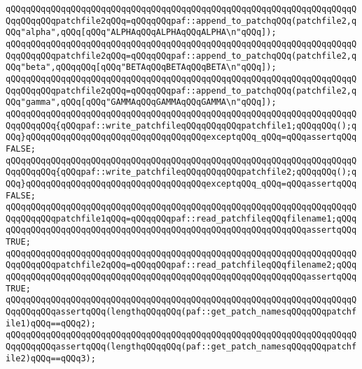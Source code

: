 \newline
\verb|qQQqqQQqqQQqqQQqqQQqqQQqqQQqqQQqqQQqqQQqqQQqqQQqqQQqqQQqqQQqqQQqqQQqqQQqqQQqqQQqpatchfile2qQQq=qQQqqQQqpaf::append_to_patchqQQq(patchfile2,qQQq"alpha",qQQq[qQQq"ALPHAqQQqALPHAqQQqALPHA\n"qQQq]);|\newline
\verb|qQQqqQQqqQQqqQQqqQQqqQQqqQQqqQQqqQQqqQQqqQQqqQQqqQQqqQQqqQQqqQQqqQQqqQQqqQQqqQQqpatchfile2qQQq=qQQqqQQqpaf::append_to_patchqQQq(patchfile2,qQQq"beta",qQQqqQQq[qQQq"BETAqQQqBETAqQQqBETA\n"qQQq]);|\newline
\verb|qQQqqQQqqQQqqQQqqQQqqQQqqQQqqQQqqQQqqQQqqQQqqQQqqQQqqQQqqQQqqQQqqQQqqQQqqQQqqQQqpatchfile2qQQq=qQQqqQQqpaf::append_to_patchqQQq(patchfile2,qQQq"gamma",qQQq[qQQq"GAMMAqQQqGAMMAqQQqGAMMA\n"qQQq]);|\newline
\newline
\verb|qQQqqQQqqQQqqQQqqQQqqQQqqQQqqQQqqQQqqQQqqQQqqQQqqQQqqQQqqQQqqQQqqQQqqQQqqQQqqQQq{qQQqpaf::write_patchfileqQQqqQQqqQQqpatchfile1;qQQqqQQq();qQQq}qQQqqQQqqQQqqQQqqQQqqQQqqQQqqQQqqQQqexceptqQQq_qQQq=qQQqassertqQQqFALSE;|\newline
\verb|qQQqqQQqqQQqqQQqqQQqqQQqqQQqqQQqqQQqqQQqqQQqqQQqqQQqqQQqqQQqqQQqqQQqqQQqqQQqqQQq{qQQqpaf::write_patchfileqQQqqQQqqQQqpatchfile2;qQQqqQQq();qQQq}qQQqqQQqqQQqqQQqqQQqqQQqqQQqqQQqqQQqexceptqQQq_qQQq=qQQqassertqQQqFALSE;|\newline
\newline
\newline
\newline
\verb|qQQqqQQqqQQqqQQqqQQqqQQqqQQqqQQqqQQqqQQqqQQqqQQqqQQqqQQqqQQqqQQqqQQqqQQqqQQqqQQqpatchfile1qQQq=qQQqqQQqpaf::read_patchfileqQQqfilename1;qQQqqQQqqQQqqQQqqQQqqQQqqQQqqQQqqQQqqQQqqQQqqQQqqQQqqQQqqQQqqQQqassertqQQqTRUE;|\newline
\verb|qQQqqQQqqQQqqQQqqQQqqQQqqQQqqQQqqQQqqQQqqQQqqQQqqQQqqQQqqQQqqQQqqQQqqQQqqQQqqQQqpatchfile2qQQq=qQQqqQQqpaf::read_patchfileqQQqfilename2;qQQqqQQqqQQqqQQqqQQqqQQqqQQqqQQqqQQqqQQqqQQqqQQqqQQqqQQqqQQqqQQqassertqQQqTRUE;|\newline
\newline
\verb|qQQqqQQqqQQqqQQqqQQqqQQqqQQqqQQqqQQqqQQqqQQqqQQqqQQqqQQqqQQqqQQqqQQqqQQqqQQqqQQqassertqQQq(lengthqQQqqQQq(paf::get_patch_namesqQQqqQQqpatchfile1)qQQq==qQQq2);|\newline
\verb|qQQqqQQqqQQqqQQqqQQqqQQqqQQqqQQqqQQqqQQqqQQqqQQqqQQqqQQqqQQqqQQqqQQqqQQqqQQqqQQqassertqQQq(lengthqQQqqQQq(paf::get_patch_namesqQQqqQQqpatchfile2)qQQq==qQQq3);|\newline
\newline
